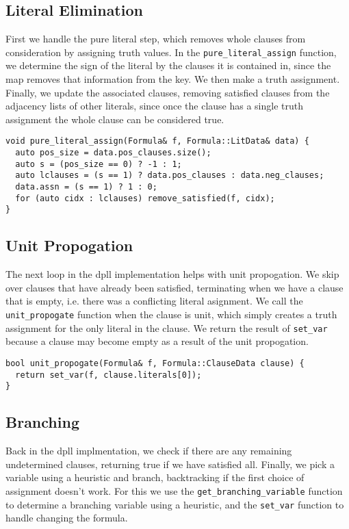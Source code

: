 \documentclass[10pt,AMS Euler]{article}
\begin{document}
\subsection*{Literal Elimination}
\label{sec:orgd62fc74}
First we handle the pure literal step, which removes whole clauses from
consideration by assigning truth values. In the \texttt{pure\_literal\_assign}
function, we determine the sign of the literal by the clauses it is
contained in, since the map removes that information from the key.
We then make a truth assignment. Finally, we update the associated clauses,
removing satisfied clauses from the adjacency lists of other literals,
since once the clause has a single truth assignment the whole clause can
be considered true.
\begin{verbatim}
void pure_literal_assign(Formula& f, Formula::LitData& data) {
  auto pos_size = data.pos_clauses.size();
  auto s = (pos_size == 0) ? -1 : 1;
  auto lclauses = (s == 1) ? data.pos_clauses : data.neg_clauses;
  data.assn = (s == 1) ? 1 : 0;
  for (auto cidx : lclauses) remove_satisfied(f, cidx);
}
\end{verbatim}

\subsection*{Unit Propogation}
\label{sec:org90f6244}
The next loop in the dpll implementation helps with unit propogation.
We skip over clauses that have already been satisfied, terminating when we
have a clause that is empty, i.e. there was a conflicting literal asignment.
We call the \texttt{unit\_propogate} function when the clause is unit, which
simply creates a truth assignment for the only literal in the clause.
We return the result of \texttt{set\_var} because a clause may become empty as a result
of the unit propogation.
\begin{verbatim}
bool unit_propogate(Formula& f, Formula::ClauseData clause) {
  return set_var(f, clause.literals[0]);
}
\end{verbatim}

\subsection*{Branching}
\label{sec:org9d852fe}
Back in the dpll implmentation, we check if there are any remaining undetermined
clauses, returning true if we have satisfied all. Finally, we pick a
variable using a heuristic and branch, backtracking if the first choice of
assignment doesn't work. For this we use the \texttt{get\_branching\_variable} function
to determine a branching variable using a heuristic, and the \texttt{set\_var}
function to handle changing the formula.
\end{document}
